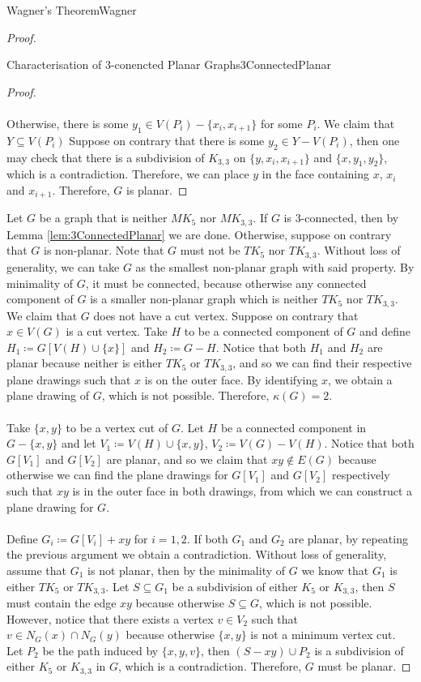 \documentclass[math]{amznotes}
\theoremstyle{remark}
\newcommand{\0}{\mathbf{0}}
\newcommand{\1}{\mathbf{1}}
\begin{document}
\begin{thmbox}{Wagner's Theorem}{Wagner}
\begin{proof}
\begin{lembox}{Characterisation of $3$-conencted Planar Graphs}{3ConnectedPlanar}
\begin{proof}
                \\\\
                Otherwise, there is some $y_1 \in V(P_i) - \{x_i, x_{i + 1}\}$ for some $P_i$. We claim that $Y \subseteq V(P_i)$ Suppose on contrary that there is some $y_2 \in Y - V(P_i)$, then one may check that there is a subdivision of $K_{3, 3}$ on $\{y, x_i, x_{i + 1}\}$ and $\{x, y_1, y_2\}$, which is a contradiction. Therefore, we can place $y$ in the face containing $x$, $x_i$ and $x_{i + 1}$. Therefore, $G$ is planar.
            \end{proof}
        \end{lembox}
        Let $G$ be a graph that is neither $MK_5$ nor $MK_{3, 3}$. If $G$ is $3$-connected, then by Lemma \ref{lem:3ConnectedPlanar} we are done. Otherwise, suppose on contrary that $G$ is non-planar. Note that $G$ must not be $TK_5$ nor $TK_{3, 3}$. Without loss of generality, we can take $G$ as the smallest non-planar graph with said property. By minimality of $G$, it must be connected, because otherwise any connected component of $G$ is a smaller non-planar graph which is neither $TK_5$ nor $TK_{3, 3}$. We claim that $G$ does not have a cut vertex. Suppose on contrary that $x \in V(G)$ is a cut vertex. Take $H$ to be a connected component of $G$ and define $H_1 \coloneqq G[V(H) \cup \{x\}]$ and $H_2 \coloneqq G - H$. Notice that both $H_1$ and $H_2$ are planar because neither is either $TK_5$ or $TK_{3, 3}$, and so we can find their respective plane drawings such that $x$ is on the outer face. By identifying $x$, we obtain a plane drawing of $G$, which is not possible. Therefore, $\kappa(G) = 2$. 
        \\\\
        Take $\{x, y\}$ to be a vertex cut of $G$. Let $H$ be a connected component in $G - \{x, y\}$ and let $V_1 \coloneqq V(H) \cup \{x, y\}$, $V_2 \coloneqq V(G) - V(H)$. Notice that both $G[V_1]$ and $G[V_2]$ are planar, and so we claim that $xy \notin E(G)$ because otherwise we can find the plane drawings for $G[V_1]$ and $G[V_2]$ respectively such that $xy$ is in the outer face in both drawings, from which we can construct a plane drawing for $G$. 
        \\\\
        Define $G_i \coloneqq G[V_i] + xy$ for $i = 1, 2$. If both $G_1$ and $G_2$ are planar, by repeating the previous argument we obtain a contradiction. Without loss of generality, assume that $G_1$ is not planar, then by the minimality of $G$ we know that $G_1$ is either $TK_5$ or $TK_{3, 3}$. Let $S \subseteq G_1$ be a subdivision of either $K_5$ or $K_{3, 3}$, then $S$ must contain the edge $xy$ because otherwise $S \subseteq G$, which is not possible. However, notice that there exists a vertex $v \in V_2$ such that $v \in N_G(x) \cap N_G(y)$ because otherwise $\{x, y\}$ is not a minimum vertex cut. Let $P_2$ be the path induced by $\{x, y, v\}$, then $(S - xy) \cup P_2$ is a subdivision of either $K_5$ or $K_{3, 3}$ in $G$, which is a contradiction. Therefore, $G$ must be planar.
    \end{proof}
\end{thmbox}
\end{document}
